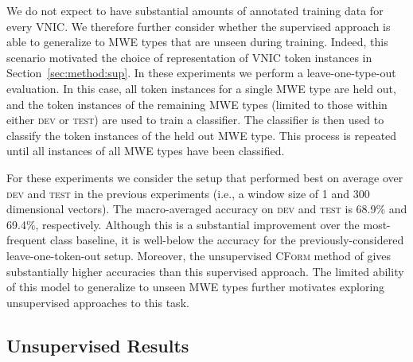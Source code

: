 \documentclass[11pt]{article}
\newcommand{\secref}[1]{Section~\ref{#1}}
\newcommand{\cform}{\textsc{CForm}\xspace}
\newcommand{\VNIC}{VNIC\xspace}
\newcommand{\dev}{\textsc{dev}\xspace}
\newcommand{\test}{\textsc{test}\xspace}
\begin{document}
We do not expect to have substantial amounts of annotated training
data for every \VNIC. We therefore further consider whether the
supervised approach is able to generalize to MWE types that are unseen
during training. Indeed, this scenario motivated the choice of
representation of \VNIC token instances in \secref{sec:method:sup}.
In these experiments we perform a leave-one-type-out evaluation. In
this case, all token instances for a single MWE type are held out, and
the token instances of the remaining MWE types (limited to those
within either \dev or \test) are used to train a classifier. The
classifier is then used to classify the token instances of the held
out MWE type. This process is repeated until all instances of all MWE
types have been classified.

For these experiments we consider the setup that performed best on
average over \dev and \test in the previous experiments (i.e., a
window size of 1 and 300 dimensional vectors).
The macro-averaged accuracy on \dev and \test is 68.9\% and 69.4\%,
respectively. Although this is a substantial improvement over the
most-frequent class baseline, it is well-below the accuracy for the
previously-considered leave-one-token-out setup. Moreover, the
unsupervised \cform method of \cite{Fazly2009} gives substantially
higher accuracies than this supervised approach. The limited ability
of this model to generalize to unseen MWE types further motivates
exploring unsupervised approaches to this task.

\subsection{Unsupervised Results}


\end{document}
